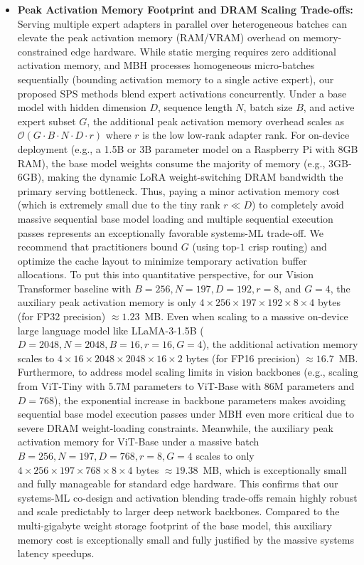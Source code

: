 \begin{itemize}
    \item \textbf{Peak Activation Memory Footprint and DRAM Scaling Trade-offs:} Serving multiple expert adapters in parallel over heterogeneous batches can elevate the peak activation memory (RAM/VRAM) overhead on memory-constrained edge hardware.
While static merging requires zero additional activation memory, and MBH processes homogeneous micro-batches sequentially (bounding activation memory to a single active expert), our proposed SPS methods blend expert activations concurrently.
Under a base model with hidden dimension $D$, sequence length $N$, batch size $B$, and active expert subset $G$, the additional peak activation memory overhead scales as $\mathcal{O}(G \cdot B \cdot N \cdot D \cdot r)$ where $r$ is the low low-rank adapter rank.
For on-device deployment (e.g., a 1.5B or 3B parameter model on a Raspberry Pi with 8GB RAM), the base model weights consume the majority of memory (e.g., 3GB-6GB), making the dynamic LoRA weight-switching DRAM bandwidth the primary serving bottleneck.
Thus, paying a minor activation memory cost (which is extremely small due to the tiny rank $r \ll D$) to completely avoid massive sequential base model loading and multiple sequential execution passes represents an exceptionally favorable systems-ML trade-off.
We recommend that practitioners bound $G$ (using top-$1$ crisp routing) and optimize the cache layout to minimize temporary activation buffer allocations.
To put this into quantitative perspective, for our Vision Transformer baseline with $B=256, N=197, D=192, r=8$, and $G=4$, the auxiliary peak activation memory is only $4 \times 256 \times 197 \times 192 \times 8 \times 4$ bytes (for FP32 precision) $\approx 1.23$~MB.
Even when scaling to a massive on-device large language model like LLaMA-3-1.5B ($D=2048, N=2048, B=16, r=16, G=4$), the additional activation memory scales to $4 \times 16 \times 2048 \times 2048 \times 16 \times 2$ bytes (for FP16 precision) $\approx 16.7$~MB.
Furthermore, to address model scaling limits in vision backbones (e.g., scaling from ViT-Tiny with 5.7M parameters to ViT-Base with 86M parameters and $D=768$), the exponential increase in backbone parameters makes avoiding sequential base model execution passes under MBH even more critical due to severe DRAM weight-loading constraints.
Meanwhile, the auxiliary peak activation memory for ViT-Base under a massive batch $B=256, N=197, D=768, r=8, G=4$ scales to only $4 \times 256 \times 197 \times 768 \times 8 \times 4$ bytes $\approx 19.38$~MB, which is exceptionally small and fully manageable for standard edge hardware.
This confirms that our systems-ML co-design and activation blending trade-offs remain highly robust and scale predictably to larger deep network backbones.
Compared to the multi-gigabyte weight storage footprint of the base model, this auxiliary memory cost is exceptionally small and fully justified by the massive systems latency speedups.

\end{itemize}

